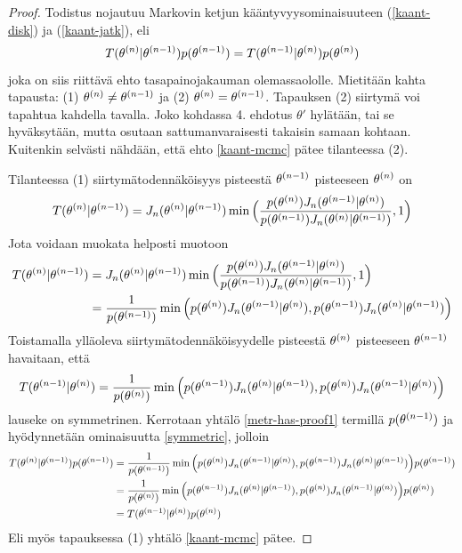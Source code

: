\begin{proof}

Todistus nojautuu Markovin ketjun kääntyvyysominaisuuteen (\ref{kaant-disk}) ja (\ref{kaant-jatk}), eli
	\begin{equation}\label{kaant-mcmc}
		T(\theta^{(n)}|\theta^{(n-1)})p(\theta^{(n-1)}) = T(\theta^{(n-1)}|\theta^{(n)})p(\theta^{(n)})
	\end{equation}
	joka on siis riittävä ehto tasapainojakauman olemassaololle. Mietitään kahta tapausta: (1) $\theta^{(n)} \neq \theta^{(n-1)}$ ja (2) $\theta^{(n)} = \theta^{(n-1)}$.
	Tapauksen (2) siirtymä voi tapahtua kahdella tavalla. Joko kohdassa 4. ehdotus $\theta'$ hylätään, tai se hyväksytään, mutta osutaan sattumanvaraisesti takaisin samaan kohtaan. Kuitenkin selvästi nähdään, että ehto \ref{kaant-mcmc} pätee tilanteessa (2).
	
	Tilanteessa (1) siirtymätodennäköisyys pisteestä $\theta^{(n-1)}$ pisteeseen $\theta^{(n)}$ on
	\begin{equation}
		T(\theta^{(n)}|\theta^{(n-1)}) = J_n(\theta^{(n)}|\theta^{(n-1)})
		\min\Big( \frac{p(\theta^{(n)})J_n(\theta^{(n-1)}|\theta^{(n)})}{p(\theta^{(n-1)})J_n(\theta^{(n)}|\theta^{(n-1)})},1 \Big)
	\end{equation}
	Jota voidaan muokata helposti muotoon
	\begin{equation}\label{metr-has-proof1}
		\begin{split}
			T(\theta^{(n)}|\theta^{(n-1)}) &= J_n(\theta^{(n)}|\theta^{(n-1)})
		\min\Big( \frac{p(\theta^{(n)})J_n(\theta^{(n-1)}|\theta^{(n)})}{p(\theta^{(n-1)})J_n(\theta^{(n)}|\theta^{(n-1)})},1 \Big) \\
		&= \frac{1}{p(\theta^{(n-1)})} \min \Big( p(\theta^{(n)})J_n(\theta^{(n-1)}|\theta^{(n)}) , p(\theta^{(n-1)})J_n(\theta^{(n)}|\theta^{(n-1)})  \Big)
		\end{split}
	\end{equation}
	Toistamalla ylläoleva siirtymätodennäköisyydelle pisteestä $\theta^{(n)}$ pisteeseen $\theta^{(n-1)}$ havaitaan, että 
	\begin{equation}\label{symmetric}
		T(\theta^{(n-1)}|\theta^{(n)})=\frac{1}{p(\theta^{(n)})} \min \Big( p(\theta^{(n-1)})J_n(\theta^{(n)}|\theta^{(n-1)}) , p(\theta^{(n)})J_n(\theta^{(n-1)}|\theta^{(n)})  \Big)
	\end{equation}
	lauseke on symmetrinen. Kerrotaan yhtälö \eqref{metr-has-proof1} termillä $p(\theta^{(n-1)})$ ja hyödynnetään ominaisuutta \eqref{symmetric}, jolloin
	\begin{equation*}
	\begin{split}
		T(\theta^{(n)}|\theta^{(n-1)})p(\theta^{(n-1)}) &= \frac{1}{p(\theta^{(n-1)})} \min \Big( p(\theta^{(n)})J_n(\theta^{(n-1)}|\theta^{(n)}) , p(\theta^{(n-1)})J_n(\theta^{(n)}|\theta^{(n-1)})  \Big) p(\theta^{(n-1)}) \\
		&= \frac{1}{p(\theta^{(n)})} \min \Big( p(\theta^{(n-1)})J_n(\theta^{(n)}|\theta^{(n-1)}) , p(\theta^{(n)})J_n(\theta^{(n-1)}|\theta^{(n)})  \Big) p(\theta^{(n)}) \\
		&= T(\theta^{(n-1)}|\theta^{(n)})p(\theta^{(n)})
	\end{split}
	\end{equation*}
	Eli myös tapauksessa (1) yhtälö \eqref{kaant-mcmc} pätee.
\end{proof}

